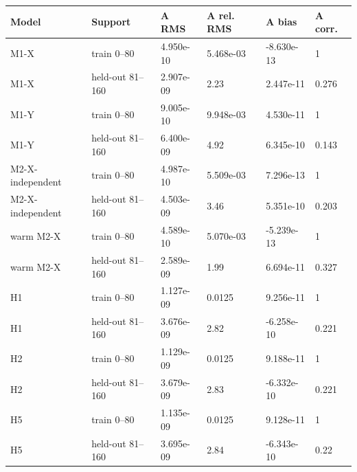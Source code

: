 \begin{tabular}{llllll}
\toprule
Model & Support & A RMS & A rel. RMS & A bias & A corr. \\
\midrule
M1-X & train 0--80 & 4.950e-10 & 5.468e-03 & -8.630e-13 & 1 \\
M1-X & held-out 81--160 & 2.907e-09 & 2.23 & 2.447e-11 & 0.276 \\
M1-Y & train 0--80 & 9.005e-10 & 9.948e-03 & 4.530e-11 & 1 \\
M1-Y & held-out 81--160 & 6.400e-09 & 4.92 & 6.345e-10 & 0.143 \\
M2-X-independent & train 0--80 & 4.987e-10 & 5.509e-03 & 7.296e-13 & 1 \\
M2-X-independent & held-out 81--160 & 4.503e-09 & 3.46 & 5.351e-10 & 0.203 \\
warm M2-X & train 0--80 & 4.589e-10 & 5.070e-03 & -5.239e-13 & 1 \\
warm M2-X & held-out 81--160 & 2.589e-09 & 1.99 & 6.694e-11 & 0.327 \\
H1 & train 0--80 & 1.127e-09 & 0.0125 & 9.256e-11 & 1 \\
H1 & held-out 81--160 & 3.676e-09 & 2.82 & -6.258e-10 & 0.221 \\
H2 & train 0--80 & 1.129e-09 & 0.0125 & 9.188e-11 & 1 \\
H2 & held-out 81--160 & 3.679e-09 & 2.83 & -6.332e-10 & 0.221 \\
H5 & train 0--80 & 1.135e-09 & 0.0125 & 9.128e-11 & 1 \\
H5 & held-out 81--160 & 3.695e-09 & 2.84 & -6.343e-10 & 0.22 \\
\bottomrule
\end{tabular}

